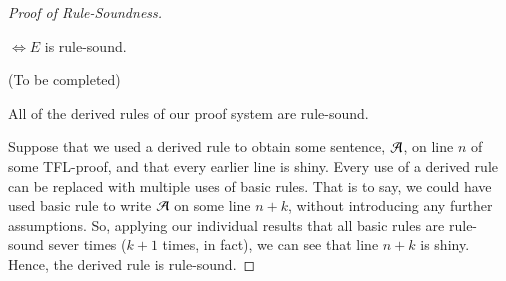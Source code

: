 \begin{proof}[Proof of Rule-Soundness]
    \begin{claim}[13]
        $\iff E$ is rule-sound.
    \end{claim}
    (To be completed)


    \begin{claim}[14]
        All of the derived rules of our proof system are rule-sound.
    \end{claim}
    Suppose that we used a derived rule to obtain some sentence, $\mathcal{A}$, on line $n$ of some TFL-proof, and that every earlier line is shiny. Every use of a derived rule can be replaced with multiple uses of basic rules. That is to say, we could have used basic rule to write $\mathcal{A}$ on some line $n+k$, without introducing any further assumptions. So, applying our individual results that all basic rules are rule-sound sever times ($k+1$ times, in fact), we can see that line $n+k$ is shiny. Hence, the derived rule is rule-sound.
\end{proof}






